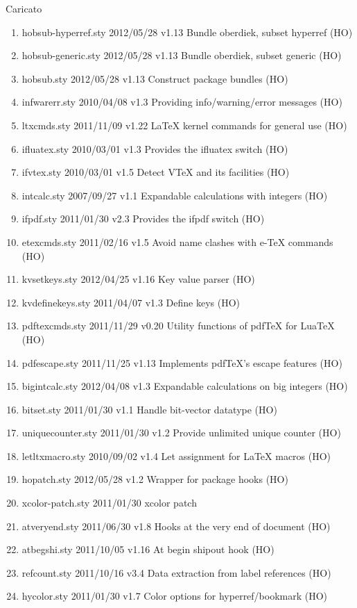 Caricato 
\begin{enumerate}
	\item hobsub-hyperref.sty    2012/05/28 v1.13 Bundle oberdiek, subset hyperref (HO)
	\item hobsub-generic.sty    2012/05/28 v1.13 Bundle oberdiek, subset generic (HO)
	\item hobsub.sty    2012/05/28 v1.13 Construct package bundles (HO)
	\item infwarerr.sty    2010/04/08 v1.3 Providing info/warning/error messages (HO)
	\item ltxcmds.sty    2011/11/09 v1.22 LaTeX kernel commands for general use (HO)
	\item ifluatex.sty    2010/03/01 v1.3 Provides the ifluatex switch (HO)
	\item ifvtex.sty    2010/03/01 v1.5 Detect VTeX and its facilities (HO)
	\item intcalc.sty    2007/09/27 v1.1 Expandable calculations with integers (HO)
	\item ifpdf.sty    2011/01/30 v2.3 Provides the ifpdf switch (HO)
	\item etexcmds.sty    2011/02/16 v1.5 Avoid name clashes with e-TeX commands (HO)
	\item kvsetkeys.sty    2012/04/25 v1.16 Key value parser (HO)
	\item kvdefinekeys.sty    2011/04/07 v1.3 Define keys (HO)
	\item pdftexcmds.sty    2011/11/29 v0.20 Utility functions of pdfTeX for LuaTeX (HO)
	\item pdfescape.sty    2011/11/25 v1.13 Implements pdfTeX's escape features (HO)
	\item bigintcalc.sty    2012/04/08 v1.3 Expandable calculations on big integers (HO)
	\item bitset.sty    2011/01/30 v1.1 Handle bit-vector datatype (HO)
	\item uniquecounter.sty    2011/01/30 v1.2 Provide unlimited unique counter (HO)
	\item letltxmacro.sty    2010/09/02 v1.4 Let assignment for LaTeX macros (HO)
	\item hopatch.sty    2012/05/28 v1.2 Wrapper for package hooks (HO)
	\item xcolor-patch.sty    2011/01/30 xcolor patch
	\item atveryend.sty    2011/06/30 v1.8 Hooks at the very end of document (HO)
	\item atbegshi.sty    2011/10/05 v1.16 At begin shipout hook (HO)
	\item refcount.sty    2011/10/16 v3.4 Data extraction from label references (HO)
	\item hycolor.sty    2011/01/30 v1.7 Color options for hyperref/bookmark (HO)
\end{enumerate} 
